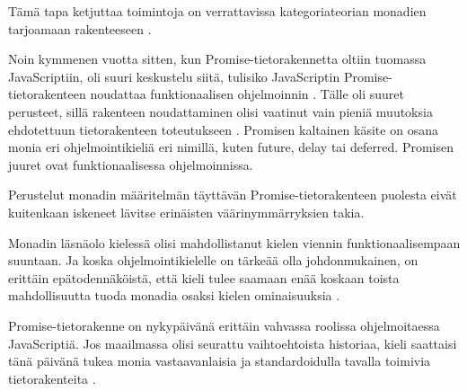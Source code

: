 Tämä tapa ketjuttaa toimintoja on verrattavissa kategoriateorian monadien tarjoamaan rakenteeseen \cite{promises-spec-94,stackoverflow:why_monad}.

Noin kymmenen vuotta sitten, kun Promise-tietorakennetta oltiin tuomassa JavaScriptiin, oli suuri keskustelu siitä, tulisiko JavaScriptin Promise-tietorakenteen noudattaa funktionaalisen ohjelmoinnin . Tälle oli suuret perusteet, sillä rakenteen noudattaminen olisi vaatinut vain pieniä muutoksia ehdotettuun tietorakenteen toteutukseen \cite{promises-spec-94}. Promisen kaltainen käsite on osana monia eri ohjelmointikieliä eri nimillä, kuten future, delay tai deferred. Promisen juuret ovat funktionaalisessa ohjelmoinnissa.

Perustelut monadin määritelmän täyttävän Promise-tietorakenteen puolesta eivät kuitenkaan iskeneet lävitse erinäisten väärinymmärryksien takia.

Monadin läsnäolo kielessä olisi mahdollistanut kielen viennin funktionaalisempaan suuntaan. Ja koska ohjelmointikielelle on tärkeää olla johdonmukainen, on erittäin epätodennäköistä, että kieli tulee saamaan enää koskaan toista mahdollisuutta tuoda monadia osaksi kielen ominaisuuksia \cite{proposal-joint-iteration,prototype_library_trends}.

Promise-tietorakenne on nykypäivänä erittäin vahvassa roolissa ohjelmoitaessa JavaScriptiä. Jos maailmassa olisi seurattu vaihtoehtoista historiaa, kieli saattaisi tänä päivänä tukea monia vastaavanlaisia ja standardoidulla tavalla toimivia tietorakenteita \cite{promises-spec-94}.
